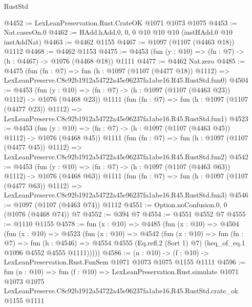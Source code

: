 \begin{lexlean}{RustStd}
\begin{coremodule}
@4452 := LexLeanPreservation.Rust.CrateOK @1071 @1073 @1075
@4453 := Nat.casesOn.{0}
@4462 := HAdd.hAdd.{0, 0, 0} @10 @10 @10 (instHAdd.{0} @10 instAddNat)
@4463 := @4462 @1155
@4467 := @1097 (@1107 (@4463 @18)) @1112
@4468 := @4462 @1153
@4475 := @4453 (fun (y : @10) => (fn : @7) -> (h : @4467) -> @1076 (@4468 @18)) @1111
@4477 := @4462 Nat.zero
@4485 := @4475
    (fun (fn : @7) =>
    fun (h : @1097 (@1107 (@4477 @18)) @1112) =>
    LexLeanPreserve.C8c92b1912a54722a45e96237fa1abe16.R45.RustStd.fun0)
@4504 := @4453
    (fun (y : @10) => (fn : @7) -> (h : @1097 (@1107 (@4463 @23)) @1112) -> @1076 (@4468 @23))
    @1111
    (fun (fn : @7) =>
    fun (h : @1097 (@1107 (@4477 @23)) @1112) =>
    LexLeanPreserve.C8c92b1912a54722a45e96237fa1abe16.R45.RustStd.fun1)
@4523 := @4453
    (fun (y : @10) => (fn : @7) -> (h : @1097 (@1107 (@4463 @45)) @1112) -> @1076 (@4468 @45))
    @1111
    (fun (fn : @7) =>
    fun (h : @1097 (@1107 (@4477 @45)) @1112) =>
    LexLeanPreserve.C8c92b1912a54722a45e96237fa1abe16.R45.RustStd.fun2)
@4542 := @4453
    (fun (y : @10) => (fn : @7) -> (h : @1097 (@1107 (@4463 @63)) @1112) -> @1076 (@4468 @63))
    @1111
    (fun (fn : @7) =>
    fun (h : @1097 (@1107 (@4477 @63)) @1112) =>
    LexLeanPreserve.C8c92b1912a54722a45e96237fa1abe16.R45.RustStd.fun3)
@4546 := @1097 (@1107 (@4463 @74)) @1112
@4551 := Option.noConfusion.{0, 0} (@1076 (@4468 @74)) @7
@4552 := @394 @7
@4554 := @4551 @4552 @7
@4555 := @1110 @1155
@4578 := fun (x : @10) =>
  @4485
    (fun (x : @10) =>
    @4504
      (fun (x : @10) =>
      @4523
        (fun (x : @10) =>
        @4542
          (fun (x : @10) =>
          fun (fn : @7) =>
          fun (h : @4546) =>
          @4554 @4555 (Eq.refl.{2} (Sort 1) @7) (heq_of_eq.{1} @1096 @4552 @4555 @1111)))))
@4586 := (n : @10) -> (f : @10) -> LexLeanPreservation.Rust.FunSem @1071 @1073 @1075 @1155 @1111
@4596 := fun (n : @10) =>
  fun (f : @10) =>
  LexLeanPreservation.Rust.simulate
    @1071
    @1073
    @1075
    LexLeanPreserve.C8c92b1912a54722a45e96237fa1abe16.R45.RustStd.crate_ok
    @1155
    @1111
\end{coremodule}
\end{lexlean}
